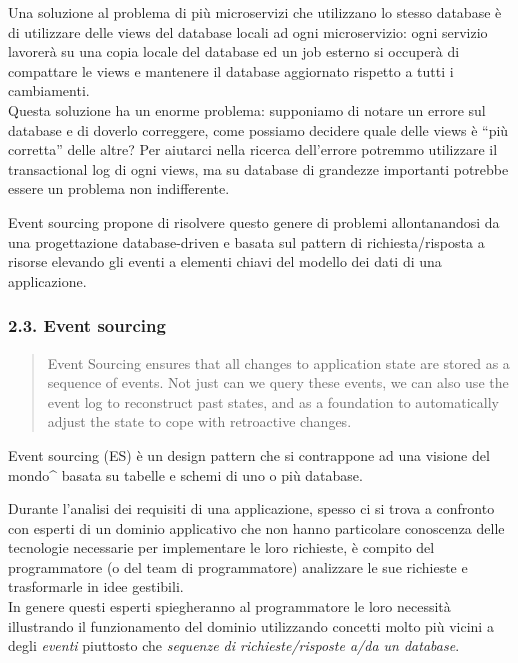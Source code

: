 \documentclass[]{article}
\begin{document}
Una soluzione al problema di più microservizi che utilizzano lo stesso
database è di utilizzare delle views del database locali ad ogni
microservizio: ogni servizio lavorerà su una copia locale del database
ed un job esterno si occuperà di compattare le views e mantenere il
database aggiornato rispetto a tutti i cambiamenti.\\
Questa soluzione ha un enorme problema: supponiamo di notare un errore
sul database e di doverlo correggere, come possiamo decidere quale delle
views è ``più corretta'' delle altre? Per aiutarci nella ricerca
dell'errore potremmo utilizzare il transactional log di ogni views, ma
su database di grandezze importanti potrebbe essere un problema non
indifferente.

Event sourcing propone di risolvere questo genere di problemi
allontanandosi da una progettazione database-driven e basata sul pattern
di richiesta/risposta a risorse elevando gli eventi a elementi chiavi
del modello dei dati di una applicazione.

\newpage

\hypertarget{event-sourcing}{\subsubsection{2.3. Event
sourcing}\label{event-sourcing}}

\begin{quote}
Event Sourcing ensures that all changes to application state are stored
as a sequence of events. Not just can we query these events, we can also
use the event log to reconstruct past states, and as a foundation to
automatically adjust the state to cope with retroactive changes.
\end{quote}

Event sourcing (ES) è un design pattern che si contrappone ad una
visione del mondo\^{} basata su tabelle e schemi di uno o più database.

Durante l'analisi dei requisiti di una applicazione, spesso ci si trova
a confronto con esperti di un dominio applicativo che non hanno
particolare conoscenza delle tecnologie necessarie per implementare le
loro richieste, è compito del programmatore (o del team di
programmatore) analizzare le sue richieste e trasformarle in idee
gestibili.\\
In genere questi esperti spiegheranno al programmatore le loro necessità
illustrando il funzionamento del dominio utilizzando concetti molto più
vicini a degli \emph{eventi} piuttosto che \emph{sequenze di
richieste/risposte a/da un database}.
\end{document}

